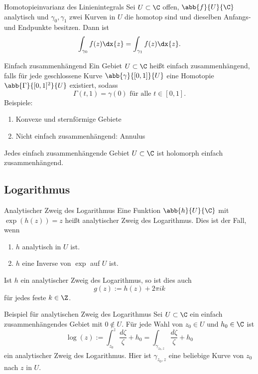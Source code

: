 \begin{karte}{Homotopieinvarianz des Linienintegrals}
    Sei \(U \subset \C\) offen, \(\abb{f}{U}{\C}\) analytisch 
    und \(\gamma_0, \gamma_1\) zwei Kurven in \(U\) die homotop sind und 
    dieselben Anfangs- und Endpunkte besitzen. Dann ist 
    \[ \int_{\gamma_0} f(z) \dx{z} = \int_{\gamma_1} f(z) \dx{z}. \]
\end{karte}

\begin{karte}{Einfach zusammenhängend}
    Ein Gebiet \(U \subset \C\) heißt einfach zusammenhängend, falls 
    für jede geschlossene Kurve \(\abb{\gamma}{[0,1]}{U}\) 
    eine Homotopie \(\abb{\Gamma}{[0,1]^2}{U}\) existiert, sodass 
    \[ \Gamma(t,1) = \gamma(0) \text{ für alle } t\in [0,1]. \]
    Beispiele: 
    \begin{enumerate}
        \item Konvexe und sternförmige Gebiete
        \item Nicht einfach zusammenhängend: Annulus
    \end{enumerate}
    Jedes einfach zusammenhängende Gebiet \(U \subset \C\) ist 
    holomorph einfach zusammenhängend.
\end{karte}

\subsection{Logarithmus}

\begin{karte}{Analytischer Zweig des Logarithmus}
    Eine Funktion \(\abb{h}{U}{\C}\) mit 
    \(\exp(h(z)) = z\) heißt analytischer Zweig des Logarithmus. 
    Dies ist der Fall, wenn 
    \begin{enumerate}
        \item \(h\) analytisch in \(U\) ist.
        \item \(h\) eine Inverse von \(\exp\) auf \(U\) ist.
    \end{enumerate}
    Ist \(h\) ein analytischer Zweig des Logarithmus, so ist dies auch 
    \[ g(z) := h(z) + 2\pi i k \]
    für jedes feste \(k\in \Z\).
\end{karte}

\begin{karte}{Beispiel für analytischen Zweig des Logarithmus}
    Sei \(U \subset \C\) ein einfach zusammenhängendes Gebiet 
    mit \(0 \notin U\). Für jede Wahl von \(z_0 \in U\) und 
    \(h_0 \in \C\) ist 
    \[ \log(z) := \int_{z_0}^z \frac{d \zeta}{\zeta}  + h_0 = \int_{\gamma_{z_0, z}} \frac{d\zeta}{\zeta} + h_0 \]
    ein analytischer Zweig des Logarithmus. Hier ist \(\gamma_{z_0, z}\) 
    eine beliebige Kurve von \(z_0\) nach \(z\) in \(U\).
\end{karte}